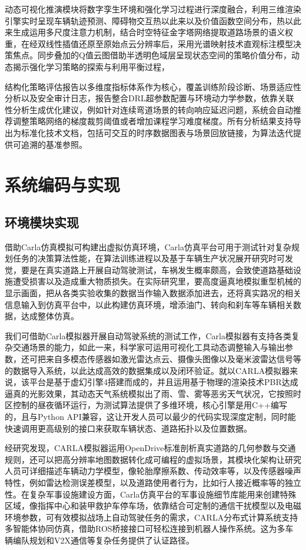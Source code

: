 动态可视化推演模块将数字孪生环境和强化学习过程进行深度融合，利用三维渲染引擎实时呈现车辆轨迹预测、障碍物交互热以此来以及价值函数空间分布，热以此来生成运用多尺度注意力机制，结合时空特征金字塔网络提取道路场景的语义权重，在经双线性插值还原至原始点云分辨率后，采用光谱映射技术直观标注模型决策焦点。同步叠加的Q值云图借助半透明色域层呈现状态空间的策略价值分布，动态揭示强化学习策略的探索与利用平衡过程，

结构化策略评估报告以多维度指标体系作为核心，覆盖训练阶段诊断、场景适应性分析以及安全审计日志，报告整合DRL超参数配置与环境动力学参数，依靠关联性分析生成优化建议，例如针对连续弯道场景的转向响应延迟问题，系统会自动推荐调整策略网络的梯度裁剪阈值或者增加课程学习难度梯度。所有分析结果支持导出为标准化技术文档，包括可交互的时序数据图表与场景回放链接，为算法迭代提供可追溯的基准参照。

\section{系统编码与实现}
\subsection{环境模块实现}


借助Carla仿真模拟可构建出虚拟仿真环境，Carla仿真平台可用于测试针对复杂规划任务的决策算法性能，在算法训练进程以及基于车辆生产状况展开研究时可发觉，要是在真实道路上开展自动驾驶测试，车祸发生概率颇高，会致使道路基础设施遭受损害以及造成重大物质损失。在实际研究里，要高度逼真地模拟重型机械的显示画面，把从各类实验收集的数据当作输入数据添加进去，还将真实路况的相关信息输入到仿真平台中，以此构建仿真环境，增添油门、转向和刹车等车辆相关数据，达成整体仿真。

我们可借助Carla模拟器开展自动驾驶系统的测试工作，Carla模拟器有支持各类复杂交通场景的能力，如此一来，科学家可运用可视化工具动态调整输入与输出参数，还可把来自多模态传感器如激光雷达点云、摄像头图像以及毫米波雷达信号等的数据导入系统，以此达成高效的数据集成以及闭环验证。就以CARLA模拟器来说，该平台是基于虚幻引擎4搭建而成的，并且运用基于物理的渲染技术PBR达成逼真的光影效果，其动态天气系统模拟出了雨、雪、雾等恶劣天气状况，它按照时区控制的昼夜循环运行，为测试算法提供了多维环境，核心引擎是用C++编写的，且与Python API兼容，这让开发人员可以最少的代码实现深度定制，同时能快速调用更高级别的接口来获取车辆状态、道路拓扑以及位置数据。

经研究发现，CARLA\cite{dosovitskiy2017carla}模拟器运用OpenDrive标准剖析真实道路的几何参数与交通规则，还可以把高分辨率地图数据转化成可编程的虚拟场景，其模块化架构让研究人员可详细描述车辆动力学模型，像轮胎摩擦系数、传动效率等，以及传感器噪声特性，例如雷达检测误差模型，以及道路使用者行为，比如行人接近概率等的独立性。在复杂军事设施建设方面，Carla仿真平台的军事设施细节库能用来创建特殊区域，像指挥中心和装甲救护车停车场，依靠结合可定制的通信干扰模型以及电磁环境参数，可有效模拟战场上自动驾驶任务的需求，CARLA分布式计算系统支持多智能体协同仿真，借助ROS桥接接口可轻松连接到机器人操作系统。这为多车辆编队规划和V2X通信等复杂任务提供了认证路径。


